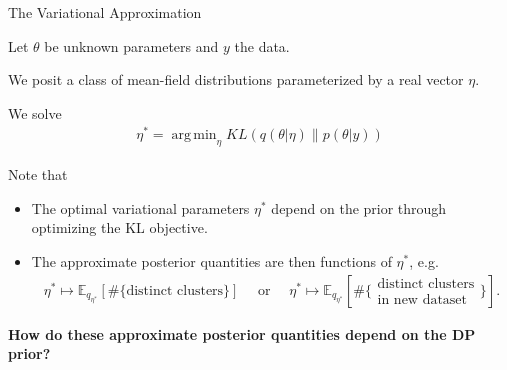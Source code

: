 \documentclass[10pt]{beamer}\usepackage[]{graphicx}\usepackage[]{color}
\newcommand{\Expect}{\mathbb{E}}
\DeclareMathOperator*{\argmin}{arg\,min}
\begin{document}
\begin{frame}{The Variational Approximation}

Let $\theta$ be unknown parameters and $y$ the data. 

We posit a class of mean-field distributions parameterized by a real vector $\eta$. 

We solve
\begin{align*}
  \eta^* = \argmin_{\eta} KL\left(
      q(\theta \vert \eta )\big\| p(\theta | y)
      \right)
\end{align*}

\pause 

Note that 

\begin{itemize}
\item The optimal variational parameters $\eta^*$ depend on the prior through optimizing the KL objective. 

\pause 

\item The approximate posterior quantities are then functions of $\eta^*$, e.g.\
\begin{align*}
\eta^* \mapsto
\Expect_{q_{\eta^*}} \left[ \#\{\text{distinct clusters}\} \right]
\quad \text{ or } \quad
\eta^* \mapsto
\Expect_{q_{\eta^*}} 
\left[\#\{\substack{\text{distinct clusters}\\\text{in new dataset}}\} \right].
\end{align*}

\pause 

\end{itemize}

\begin{mdframed}[style=MyFrame]
\begin{center}
{\bf How do these approximate posterior quantities depend on the DP prior?}
\end{center}
\end{mdframed}

\end{frame}
\end{document}
